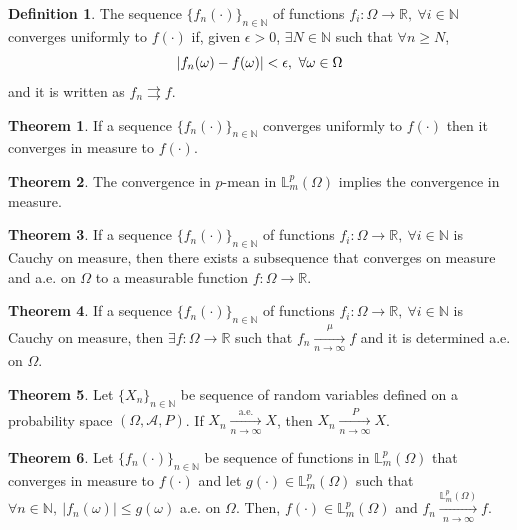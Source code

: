 \documentclass[11pt,letterpaper]{article}
\newcommand{\NN}{{\mathbb{N}}}
\newcommand{\LL}{{\mathbb{L}}}
\newcommand{\RR}{{\mathbb{R}}}
\newcommand{\A}{{\mathcal{A}}}
\let\originalleft\left
\let\originalright\right
\renewcommand{\left}{\mathopen{}\mathclose\bgroup\originalleft}
\renewcommand{\right}{\aftergroup\egroup\originalright}
\theoremstyle{definition}
\newtheorem{definition}{Definition}[section]
\newtheorem{theorem}{Theorem}[section]
\begin{document}
\begin{definition}
The sequence $\{f_n(\cdot)\}_{n\in\NN}$ of functions $f_i:\Omega\rightarrow\RR, \ \forall i\in\NN$ converges uniformly to $f(\cdot)$ if, given $\epsilon>0$, $\exists N\in\NN$ such that $\forall n\geq N$,
\begin{equation}
    \left|f_n(\omega)-f(\omega)\right|<\epsilon,\ \forall\omega\in\Omega
\end{equation}
and it is written as $f_n\rightrightarrows f$.
\end{definition}
\begin{theorem}
If a sequence $\{f_n(\cdot)\}_{n\in\NN}$ converges uniformly to $f(\cdot)$ then it converges in measure to $f(\cdot)$.
\end{theorem}

\begin{theorem}
The convergence in $p$-mean in $\LL_m^p(\Omega)$ implies the convergence in measure.
\end{theorem}

\begin{theorem}
If a sequence $\{f_n(\cdot)\}_{n\in\NN}$ of functions $f_i:\Omega\rightarrow\RR, \ \forall i\in\NN$ is Cauchy on measure, then there exists a subsequence that converges on measure and a.e. on $\Omega$ to a measurable function $f:\Omega\rightarrow\RR$.
\end{theorem}

\begin{theorem}
If a sequence $\{f_n(\cdot)\}_{n\in\NN}$ of functions $f_i:\Omega\rightarrow\RR, \ \forall i\in\NN$ is Cauchy on measure, then $\exists f:\Omega\rightarrow\RR$ such that $f_n\xrightarrow[n\rightarrow\infty]{\mu}f$ and it is determined a.e. on $\Omega$.
\end{theorem}

\begin{theorem}
Let $\{X_n\}_{n\in\NN}$ be sequence of random variables defined on a probability space $(\Omega,\A,P)$. If $X_n\xrightarrow[n\rightarrow\infty]{\text{a.e.}}X$, then $X_n\xrightarrow[n\rightarrow\infty]{P}X$.
\end{theorem}

\begin{theorem}
Let $\{f_n(\cdot)\}_{n\in\NN}$ be sequence of functions in $\LL_m^p(\Omega)$ that converges in measure to $f(\cdot)$ and let $g(\cdot)\in\LL_m^p(\Omega)$ such that $\forall n\in\NN,\ |f_n(\omega)|\leq g(\omega)$ a.e. on $\Omega$. Then, $f(\cdot)\in\LL_m^p(\Omega)$ and $f_n\xrightarrow[n\rightarrow\infty]{\LL_m^p(\Omega)}f$.
\end{theorem}
\end{document}
